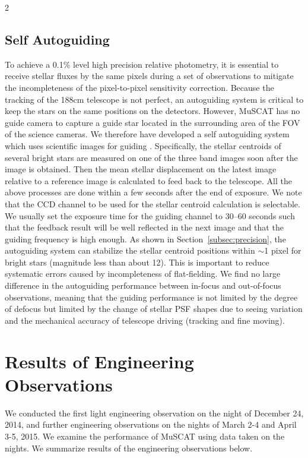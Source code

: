 \documentclass[a4paper,12pt]{spieman}  %
\begin{document}
\begin{spacing}{2}
\subsection{Self Autoguiding}
\label{subsec:self}

To achieve a 0.1\% level high precision relative photometry,
it is essential to receive stellar fluxes by the same pixels
during a set of observations to mitigate the incompleteness of
the pixel-to-pixel sensitivity correction.
Because the tracking of the 188cm telescope is not perfect,
an autoguiding system is critical to keep the stars on the same positions on the detectors.
However, MuSCAT has no guide camera to capture a guide star located
in the surrounding area of the FOV of the science cameras.
We therefore have developed a self autoguiding system which uses scientific images for guiding
\cite{2013PASJ...65...27N,2013ApJ...773..144N,2013ApJ...770...95F,2014ApJ...790..108F}.
Specifically, the stellar centroids of several bright stars are measured on
one of the three band images soon after the image is obtained.
Then the mean stellar displacement on the latest image relative to
a reference image is calculated to feed back to the telescope.
All the above processes are done within a few seconds after the end of exposure.
We note that the CCD channel to be used for the stellar centroid calculation is selectable.
We usually set the exposure time for the guiding channel to 30--60 seconds
such that the feedback result will be well reflected in the next image
and that the guiding frequency is high enough.
As shown in Section~\ref{subsec:precision}, the autoguiding system can stabilize
the stellar centroid positions within $\sim$1 pixel for bright stars (magnitude less than about 12).
This is important to reduce systematic errors caused by incompleteness of flat-fielding.
We find no large difference in the autoguiding performance
between in-focus and out-of-focus observations, meaning that the guiding performance is not limited
by the degree of defocus but limited by the change of stellar PSF shapes due to seeing variation
and the mechanical accuracy of telescope driving (tracking and fine moving).



\section{Results of Engineering Observations}
\label{sect:test}  %

We conducted the first light engineering observation on the night of December 24, 2014,
and further engineering observations on the nights of March 2-4 and April 3-5, 2015.
We examine the performance of MuSCAT using data taken on the nights.
We summarize results of the engineering observations below.


\end{spacing}
\end{document}
